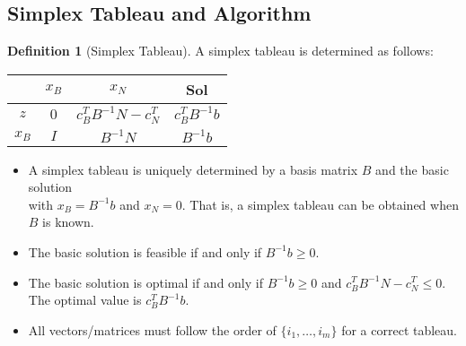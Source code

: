 \documentclass{article}
\theoremstyle{definition}
\newtheorem{definition}{Definition}[section]
\begin{document}
    \subsection{Simplex Tableau and Algorithm}
	\begin{definition}[Simplex Tableau]\hfill\break
		A simplex tableau is determined as follows:\\
		\begin{center}
		\begin{tabular}{ | c | c | c | c | } 
			\hline
			& $x_B$ & $x_N$ & Sol \\
			\hline
			$z$ & $0$ & $c_B^TB^{-1}N-c_N^T$ & $c_B^TB^{-1}b$ \\
			\hline
			$x_B$ & $I$ & $B^{-1}N$ & $B^{-1}b$ \\
			\hline
		\end{tabular}
		\end{center}
        
        \hfill
		\begin{itemize}
			\item A simplex tableau is uniquely determined by a basis matrix $B$ and the basic solution\\ with $x_B = B^{-1}b$ and $x_N = 0$. That is, a simplex tableau can be obtained when $B$ is known.
			\item The basic solution is feasible if and only if $B^{-1}b \geq 0$.
			\item The basic solution is optimal if and only if $B^{-1}b \geq 0$ and $c_B^TB^{-1}N-c_N^T \leq 0$. The optimal value is $c_B^TB^{-1}b$.
			\item All vectors/matrices must follow the order of $\{i_1, \dots, i_m\}$ for a correct tableau.
		\end{itemize}
	\end{definition}
\end{document}
